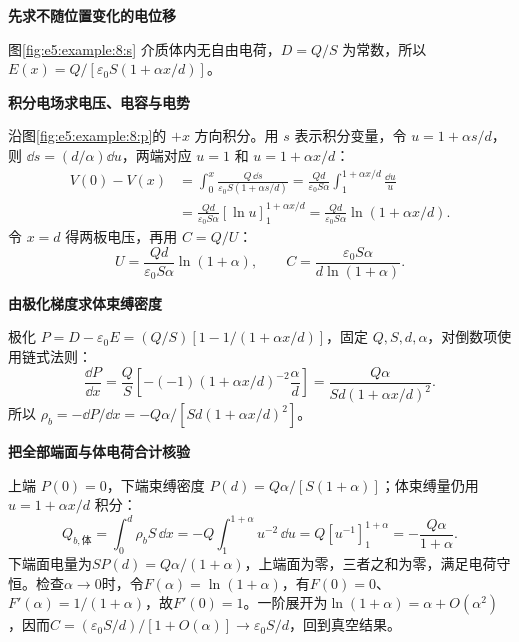 \begin{solution}\textbf{先求不随位置变化的电位移}\par\nobreak
图\ref{fig:e5:example:8:s} 介质体内无自由电荷，$D=Q/S$ 为常数，所以 $E(x)=Q/[\varepsilon_0S(1+\alpha x/d)]$。

\par\medskip{}\noindent\textbf{积分电场求电压、电容与电势}\par\nobreak
沿图\ref{fig:e5:example:8:p}的 $+x$ 方向积分。用 $s$ 表示积分变量，令 $u=1+\alpha s/d$，则 $\dd s=(d/\alpha)\dd u$，两端对应 $u=1$ 和 $u=1+\alpha x/d$：
\begin{align*}
V(0)-V(x)
&=\int_0^x \frac{Q\,\dd s}{\varepsilon_0S(1+\alpha s/d)}
=\frac{Qd}{\varepsilon_0S\alpha}\int_1^{1+\alpha x/d}\frac{\dd u}{u}\\
&=\frac{Qd}{\varepsilon_0S\alpha}[\ln u]_1^{1+\alpha x/d}
=\frac{Qd}{\varepsilon_0S\alpha}\ln(1+\alpha x/d).
\end{align*}
令 $x=d$ 得两板电压，再用 $C=Q/U$：
\[
U=\frac{Qd}{\varepsilon_0S\alpha}\ln(1+\alpha),\qquad
C=\frac{\varepsilon_0S\alpha}{d\ln(1+\alpha)}.
\]



\par\medskip{}\noindent\textbf{由极化梯度求体束缚密度}\par\nobreak
极化 $P=D-\varepsilon_0E=(Q/S)[1-1/(1+\alpha x/d)]$，固定 $Q,S,d,\alpha$，对倒数项使用链式法则：
\[
\frac{\dd P}{\dd x}
=\frac QS\left[-(-1)(1+\alpha x/d)^{-2}\frac{\alpha}{d}\right]
=\frac{Q\alpha}{Sd(1+\alpha x/d)^2}.
\]
所以 $\rho_b=-\dd P/\dd x=-Q\alpha/[Sd(1+\alpha x/d)^2]$。


\par\medskip{}\noindent\textbf{把全部端面与体电荷合计核验}\par\nobreak
上端 $P(0)=0$，下端束缚密度 $P(d)=Q\alpha/[S(1+\alpha)]$；体束缚量仍用 $u=1+\alpha x/d$ 积分：
\[
Q_{b,\text{体}}=\int_0^d \rho_b S\,\dd x
=-Q\int_1^{1+\alpha}u^{-2}\,\dd u
=Q[u^{-1}]_1^{1+\alpha}
=-\frac{Q\alpha}{1+\alpha}.
\]
下端面电量为$SP(d)=Q\alpha/(1+\alpha)$，上端面为零，三者之和为零，满足电荷守恒。检查$\alpha\to0$时，令$F(\alpha)=\ln(1+\alpha)$，有$F(0)=0$、$F'(\alpha)=1/(1+\alpha)$，故$F'(0)=1$。一阶展开为$\ln(1+\alpha)=\alpha+O(\alpha^2)$，因而$C=(\varepsilon_0S/d)/[1+O(\alpha)]\to\varepsilon_0S/d$，回到真空结果。\end{solution}
